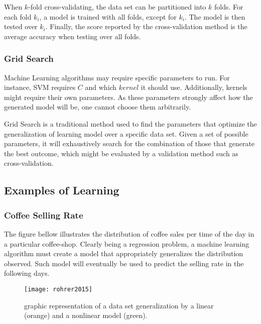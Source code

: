 When $k$-fold cross-validating, \cite{crossvalid} the data set can be partitioned into $k$ folds. For each fold $k_i$, a model is trained with all folds, except for $k_i$. The model is then tested over $k_i$. Finally, the score reported by the cross-validation method is the average accuracy when testing over all folds.

\subsubsection{Grid Search}

Machine Learning algorithms may require specific parameters to run. For instance, SVM requires $C$ and which $kernel$ it should use. Additionally, kernels might require their own parameters. As these parameters strongly affect how the generated model will be, one cannot choose them arbitrarily.

Grid Search is a traditional method used to find the parameters that optimize the generalization of learning model over a specific data set. \cite{gridsearch} Given a set of possible parameters, it will exhaustively search for the combination of those that generate the best outcome, which might be evaluated by a validation method such as cross-validation.

\subsection{Examples of Learning}

\subsubsection{Coffee Selling Rate}

The figure bellow illustrates the distribution of coffee sales per time of the day in a particular coffee-shop. \cite{roh2015} Clearly being a regression problem, a machine learning algorithm must create a model that appropriately generalizes the distribution observed. Such model will eventually be used to predict the selling rate in the following days.

\begin{figure}[H]
	\centering
	\captionsetup{justification=centering}

	\texttt{[image: rohrer2015]}
	\caption{graphic representation of a data set generalization by a linear (orange) and a nonlinear model (green). \cite{roh2015}}
	\label{fig:rohrer2015}
\end{figure}

